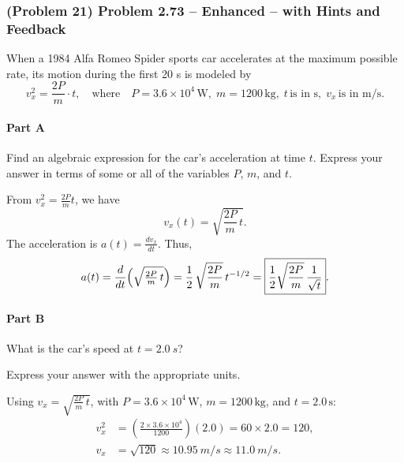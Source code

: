 \newpage

\subsubsection{(Problem 21) Problem 2.73 -- Enhanced -- with Hints and Feedback}

When a 1984 Alfa Romeo Spider sports car accelerates at the maximum possible rate, its motion during the first 20 s is modeled by
\[
	v_x^2 = \frac{2P}{m} \cdot t,\quad\text{where}\quad P = 3.6 \times 10^4\,\mathrm{W},\; m = 1200\,\mathrm{kg},\; t\,\text{is in s},\; v_x\,\text{is in m/s}.
\]

\paragraph{Part A}
Find an algebraic expression for the car's acceleration at time \( t \).
Express your answer in terms of some or all of the variables \( P \), \( m \), and \( t \).

\begin{solution}
	From \( v_x^2 = \tfrac{2P}{m} t\), we have
	\[
		v_x(t) = \sqrt{\frac{2P}{m} \, t}.
	\]
	The acceleration is \( a(t) = \frac{dv_x}{dt} \). Thus,
	\begin{align*}
		a(t) &= \frac{d}{dt}\Bigl(\sqrt{\tfrac{2P}{m}\,t}\Bigr)
		= \frac{1}{2}\,\sqrt{\frac{2P}{m}}\,t^{-1/2}
		= \boxed{\frac{1}{2}\sqrt{\frac{2P}{m}}\,\frac{1}{\sqrt{t}}}.\\
	\end{align*}
\end{solution}

\paragraph{Part B}
What is the car's speed at \( t = \SI{2.0}{s}\)?

Express your answer with the appropriate units.

\begin{solution}
	Using \( v_x = \sqrt{\tfrac{2P}{m}\,t}\), with \( P = 3.6\times10^4\,\mathrm{W} \), \( m = 1200\,\mathrm{kg} \), and \( t = 2.0\,\mathrm{s}\):
	\begin{align*}
		v_x^2 &= \left(\frac{2\times3.6\times10^4}{1200}\right) (2.0) = 60 \times 2.0 = 120,\\
		v_x &= \sqrt{120} \approx \SI{10.95}{m/s} \approx \boxed{\SI{11.0}{m/s}}.\\
	\end{align*}
\end{solution}

